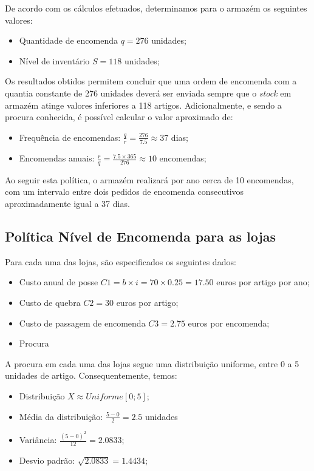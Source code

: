 De acordo com os cálculos efetuados, determinamos para o armazém os seguintes
valores:

\begin{itemize}
\item Quantidade de encomenda $q = 276$ unidades;
\item Nível de inventário     $S = 118$ unidades;
\end{itemize}

Os resultados obtidos permitem concluir que uma ordem de encomenda com a quantia
constante de 276 unidades deverá ser enviada sempre que o \emph{stock} em armazém
atinge valores inferiores a 118 artigos. Adicionalmente, e sendo a procura
conhecida, é possível calcular o valor aproximado de:

\begin{itemize}
\item Frequência de encomendas: $\frac{q}{r} = \frac{276}{7.5} \approx 37$ dias;
\item Encomendas anuais: $\frac{r}{q} = \frac{7.5 \times 365}{276} \approx 10$ encomendas;
\end{itemize}

Ao seguir esta política, o armazém realizará por ano cerca de 10 encomendas, com
um intervalo entre dois pedidos de encomenda consecutivos aproximadamente igual
a 37 dias.   


\subsection{Política Nível de Encomenda para as lojas}

Para cada uma das lojas, são especificados os seguintes dados:

\begin{itemize}
\item Custo anual de posse $C1 = b \times i = 70 \times 0.25 = 17.50$ 
	euros por artigo por ano;
\item Custo de quebra $C2 = 30$ euros por artigo;
\item Custo de passagem de encomenda $C3 = 2.75$ euros por encomenda;
\item Procura 
\end{itemize}

A procura em cada uma das lojas segue uma distribuição uniforme, entre
0 a 5 unidades de artigo. Consequentemente, temos:

\begin{itemize}
\item Distribuição           $X \approx Uniforme[0;5];$
\item Média da distribuição: $\frac{5 - 0}{2}= 2.5$ unidades
	\item Variância:             $\frac{(5 - 0)^2}{12}= 2.0833$;
	\item Desvio padrão:         $\sqrt{2.0833}= 1.4434$;
\end{itemize}

